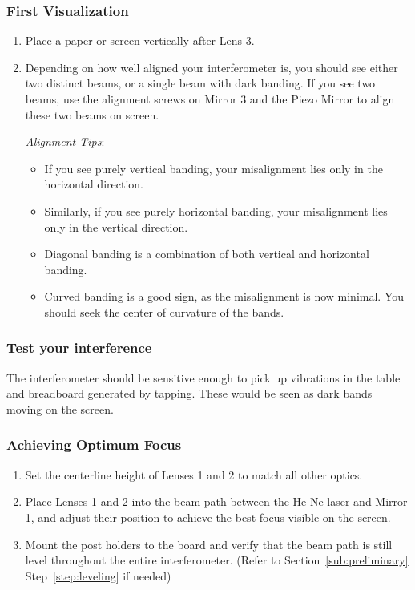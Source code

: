     \subsubsection{First Visualization}
        \begin{enumerate}
        \item Place a paper or screen vertically after Lens 3.
        \item Depending on how well aligned your interferometer is, you should
        see either two distinct beams, or a single beam with dark banding. If
        you see two beams, use the alignment screws on Mirror 3 and the Piezo
        Mirror to align these two beams on screen.

            \emph{Alignment Tips}:
            \begin{itemize}
            \item If you see purely vertical banding, your misalignment lies
            only in the horizontal direction.
            \item Similarly, if you see purely horizontal banding, your
            misalignment lies only in the vertical direction.
            \item Diagonal banding is a combination of both vertical and
            horizontal banding.
            \item Curved banding is a good sign, as the misalignment is now
            minimal.  You should seek the center of curvature of the bands.
            \end{itemize}
        \end{enumerate} 
    \subsubsection{Test your interference}

        The interferometer should be sensitive enough to pick up vibrations in
        the table and breadboard generated by tapping. These would be seen as
        dark bands moving on the screen.
    \subsubsection{Achieving Optimum Focus}
        \begin{enumerate}
        \item Set the centerline height of Lenses 1 and 2 to match all other
        optics.
        \item Place Lenses 1 and 2 into the beam path between the He-Ne laser
        and Mirror 1, and adjust their position to achieve the best focus
        visible on the screen.
        \item Mount the post holders to the board and verify that the beam path
        is still level throughout the entire interferometer. (Refer to
        Section~\ref{sub:preliminary} Step~\ref{step:leveling} if needed)
        \end{enumerate}


